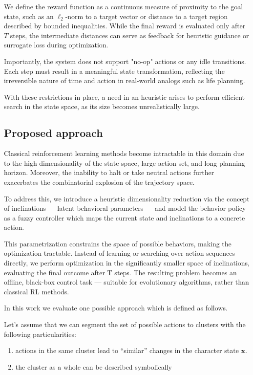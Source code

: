 \documentclass[11pt, a4paper]{article}
\begin{document}
We define the reward function as a continuous measure of proximity to the goal state, such as an $\ell_2$-norm to a target vector or distance to a target region described by bounded inequalities. While the final reward is evaluated only after $𝑇$ steps, the intermediate distances can serve as feedback for heuristic guidance or surrogate loss during optimization.

Importantly, the system does not support "no-op" actions or any idle transitions. Each step must result in a meaningful state transformation, reflecting the irreversible nature of time and action in real-world analogs such as life planning.

	With these restrictions in place, a need in an heuristic arises to perform efficient search in the state space, as its size becomes unrealistically large.
	
	\subsection{Proposed approach}

Classical reinforcement learning methods become intractable in this domain due to the high dimensionality of the state space, large action set, and long planning horizon. Moreover, the inability to halt or take neutral actions further exacerbates the combinatorial explosion of the trajectory space.

To address this, we introduce a heuristic dimensionality reduction via the concept of inclinations — latent behavioral parameters — and model the behavior policy as a fuzzy controller which maps the current state and inclinations to a concrete action.

This parametrization constrains the space of possible behaviors, making the optimization tractable. Instead of learning or searching over action sequences directly, we perform optimization in the significantly smaller space of inclinations, evaluating the final outcome after T steps. The resulting problem becomes an offline, black-box control task — suitable for evolutionary algorithms, rather than classical RL methods.





	In this work we evaluate one possible approach which is defined as follows.
	
	Let's assume that we can segment the set of possible actions to clusters with the following particularities:
	
	\begin{enumerate}
		\item actions in the same cluster lead to ``similar'' changes in the character state $\mathbf{x}$.
		\item the cluster as a whole can be described symbolically
	\end{enumerate}
	
\end{document}
